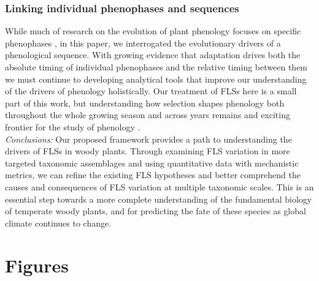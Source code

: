 \documentclass{article}
\begin{document}
\subsubsection*{Linking individual phenophases and sequences} %
\noindent While much of research on the evolution of plant phenology focuses on specific phenophases  \citep[e.g.][]{Savage2013,OLLERTON_1992}, in this paper, we interrogated the evolutionary drivers of a phenological sequence. With growing evidence that adaptation drives both the absolute timing of individual phenophases and the relative timing between them we must continue to developing analytical tools that improve our understanding of the drivers of phenology holistically. %
Our treatment of FLSs here is a small part of this work, but understanding how selection shapes phenology both throughout the whole growing season and across years remains and exciting frontier for the study of phenology \citep{Wolkovich2014b}. \\

\noindent \emph{Conclusions:} Our proposed framework provides a path to understanding the drivers of FLSs in woody plants. Through examining FLS variation in more targeted taxonomic assemblages and using quantitative data with mechanistic metrics, we can refine the existing FLS hypotheses and better comprehend the causes and consequences of FLS variation at multiple taxonomic scales. This is an essential step towards a more complete understanding of the fundamental biology of temperate woody plants, and for predicting the fate of these species as global climate continues to change.




\section*{Figures}
\end{document}
